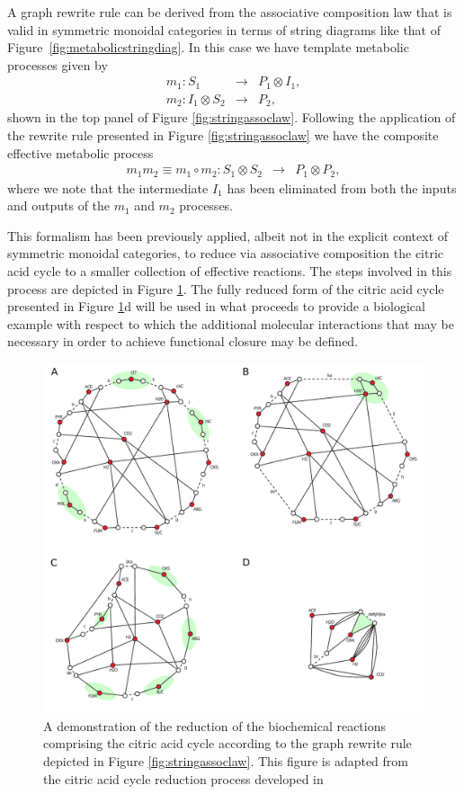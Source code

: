 A graph rewrite rule can be derived from the associative composition law that is valid in symmetric monoidal categories in terms of string diagrams like that of Figure~\ref{fig:metabolicstringdiag}. In this case we have template metabolic processes given by 
\begin{eqnarray*}
m_1 \colon S_1 &\longrightarrow& P_1 \otimes I_1,\\
m_2 \colon I_1 \otimes S_2 &\longrightarrow& P_2,
\end{eqnarray*}
shown in the top panel of Figure \ref{fig:stringassoclaw}. Following the application of the rewrite rule presented in Figure \ref{fig:stringassoclaw} we have the composite effective metabolic process
\begin{eqnarray*}
m_{1}m_{2} \equiv m_1 \circ m_2 \colon S_1 \otimes S_2 &\longrightarrow& P_1 \otimes P_2,
\end{eqnarray*}
where we note that the intermediate $I_1$ has been eliminated from both the inputs and outputs of the $m_1$ and $m_2$ processes.

This formalism has been previously applied, albeit not in the explicit context of symmetric monoidal categories, to reduce via associative composition the citric acid cycle to a smaller collection of effective reactions. The steps involved in this process are depicted in Figure \ref{fig:ctacycred}. The fully reduced form of the citric acid cycle presented in Figure \ref{fig:ctacycred}d will be used in what proceeds to provide a biological example with respect to which the additional molecular interactions that may be necessary in order to achieve functional closure may be defined.

\begin{figure}
\begin{center}
\noindent\includegraphics[width=0.9\columnwidth]{fig/rTCA-reduction.pdf}
\end{center}
\caption{A demonstration of the reduction of the biochemical reactions comprising the citric acid cycle according to the graph rewrite rule depicted in Figure \ref{fig:stringassoclaw}. This figure is adapted from the citric acid cycle reduction process developed in \cite{Braakman2012a}}
\label{fig:ctacycred}
\end{figure}
